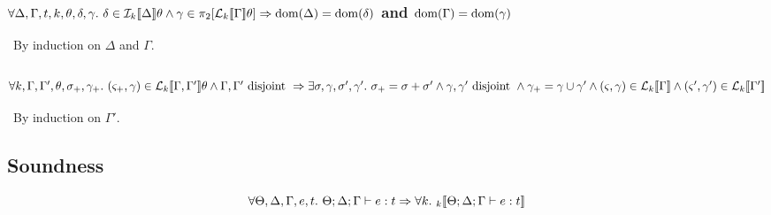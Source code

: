\subsubsection{$\forall \Delta, \Gamma, t, k, \theta, \delta, \gamma.\ %
    \delta \in \den{I}{k}{\Delta}\theta \wedge \gamma \in \pi_2[\den{L}{k}{\Gamma}\theta]
    \Rightarrow \dom(\Delta) = \dom(\delta)$ and $\mathrm{dom}(\Gamma) = \mathrm{dom}(\gamma)$}\label{samedom}

\pf~By induction on $\Delta$ and $\Gamma$.

\subsubsection{$\forall k, \Gamma, \Gamma', \theta, \sigma_+, \gamma_+.\ %
    (\varsigma_+, \gamma) \in \den{L}{k}{ \Gamma, \Gamma' }\theta
    \wedge \Gamma, \Gamma' \textrm{ disjoint } \Rightarrow\\
    \exists \sigma, \gamma, \sigma' , \gamma' .\ \sigma_+ = \sigma + \sigma'
    \wedge \gamma, \gamma' \textrm{ disjoint }
    \wedge \gamma_+ = \gamma \cup \gamma'\\
    \wedge (\varsigma, \gamma) \in \den{L}{k}{\Gamma}
    \wedge (\varsigma', \gamma') \in \den{L}{k}{\Gamma'} $}\label{restriction}

\pf~By induction on $\Gamma'$.

\clearpage%
\subsection{Soundness}
\[
    \forall \Theta, \Delta, \Gamma, e, t.\ \Theta; \Delta ; \Gamma \vdash e : t \Rightarrow
    \forall k.\ \mathcal{}_{k} [\![  \Theta; \Delta ; \Gamma \vdash e : t  ]\!]
\]

